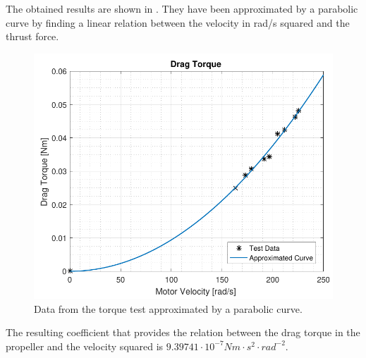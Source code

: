 The obtained results are shown in . They have been approximated by a parabolic curve by finding a linear relation between the velocity in rad/s squared and the thrust force.

\begin{figure}[H]
	\centering
	\includegraphics[scale=0.8]{figures/TorqueGraph}
	\caption{Data from the torque test approximated by a parabolic curve.}
	\label{TorqueGraph}
\end{figure}

The resulting coefficient that provides the relation between the drag torque in the propeller and the velocity squared is $9.39741\cdot10^{-7} Nm\cdot s^2\cdot rad^{-2}$.
